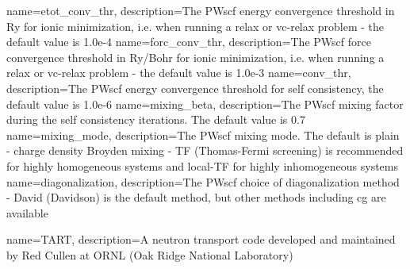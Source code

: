 {
    name=etot\_conv\_thr,
    description={The PWscf energy convergence threshold in Ry for ionic minimization, i.e. when running a relax or vc-relax problem\cite{inputpw} - the default value is 1.0e-4}
}
{
    name=forc\_conv\_thr,
    description={The PWscf force convergence threshold in Ry/Bohr for ionic minimization, i.e. when running a relax or vc-relax problem\cite{inputpw} - the default value is 1.0e-3}
}
{
    name=conv\_thr,
    description={The PWscf energy convergence threshold for self consistency\cite{inputpw}, the default value is 1.0e-6}
}
{
    name=mixing\_beta,
    description={The PWscf mixing factor during the self consistency iterations\cite{inputpw}.  The default value is 0.7}
}
{
    name=mixing\_mode,
    description={The PWscf mixing mode\cite{inputpw}.  The default is plain - charge density Broyden mixing - TF (Thomas-Fermi screening) is recommended for highly homogeneous systems and local-TF for highly inhomogeneous systems}
}
{
    name=diagonalization,
    description={The PWscf choice of diagonalization method\cite{inputpw} - David (Davidson) is the default method, but other methods including \acrshort{cg} are available}
}

{
    name=TART,
    description={A neutron transport code developed and maintained by Red Cullen at ORNL (Oak Ridge National Laboratory)}
}







